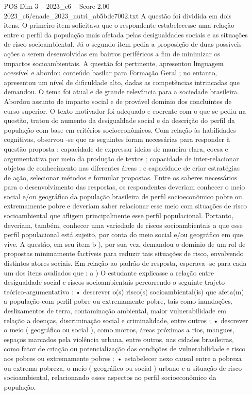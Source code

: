 \begin{textsample}{POS Dim 3 – 2023\_c6 – Score 2.00 – 2023\_c6/enade\_2023\_nutri\_ab5bde7002.txt}
A questão foi dividida em dois itens.
O primeiro item solicitava que o respondente estabelecesse uma relação entre o perfil da população mais afetada pelas desigualdades sociais e as situações de risco socioambiental.
Já o segundo item pedia a proposição de duas possíveis ações a serem desenvolvidas em bairros periféricos a fim de minimizar os impactos socioambientais.
A questão foi pertinente, apresentou linguagem acessível e abordou conteúdo basilar para Formação Geral ; no entanto, apresentou um nível de dificuldade alto, dadas as competências intrincadas que demandou.
O tema foi atual e de grande relevância para a sociedade brasileira.
Abordou assunto de impacto social e de provável domínio dos concluintes de curso superior.
O texto motivador foi adequado e coerente com o que se pediu na questão, tratou do aumento da desigualdade social e da descrição do perfil da população com base em critérios socioeconômicos.
Com relação às habilidades cognitivas, observou -se que as seguintes foram necessárias para responder à questão proposta : capacidade de expressar ideias de maneira clara, coesa e argumentativa por meio da produção de textos ; capacidade de inter-relacionar objetos de conhecimento nas diferentes áreas ; e capacidade de criar estratégias de ação, selecionar métodos e formular propostas.
Entre os saberes necessários para o desenvolvimento das respostas, os respondentes deveriam conhecer o meio social e/ou geográfico da população brasileira de perfil socioeconômico pobre ou extremamente pobre e deveriam saber relacionar esse meio com situações de risco socioambiental que afligem principalmente esse perfil populacional.
Portanto, deveriam, também, conhecer uma variedade de riscos socioambientais a que esse perfil populacional está sujeito, por conta do meio social e/ou geográfico em que vive.
A questão, em seu item b ), por sua vez, demandou o domínio de um rol de propostas minimamente factíveis para reduzir tais situações de risco, envolvendo distintos atores sociais.
Em relação ao padrão de resposta, esperava -se para cada um dos itens avaliados que : a ) O estudante explicasse a relação entre desigualdade social e riscos socioambientais percorrendo o seguinte trajeto teórico-argumentativo : • descrever o(s) risco(s) socioambiental(is) que afeta(m) a população com perfil pobre ou extremamente pobre, tais como inundações, deslizamentos de terra, contaminação ambiental, maior vulnerabilidade em relação a doenças, discriminação social e criminalidade, entre outros ; • descrever o meio ( geográfico ou social ), como morros, áreas próximas a rios, mangues, espaços marcados pela violência urbana, entre outros, nas cidades brasileiras, como fator de criação ou potencialização das condições de vulnerabilidade e risco aos pobres ou extremamente pobres ; • estabelecer nexo causal entre a pobreza ou extrema pobreza, o meio ( geográfico ou social ) urbano e a situação de risco socioambiental, relacionando esses aspectos ao perfil socioeconômico da população.

\end{textsample}
